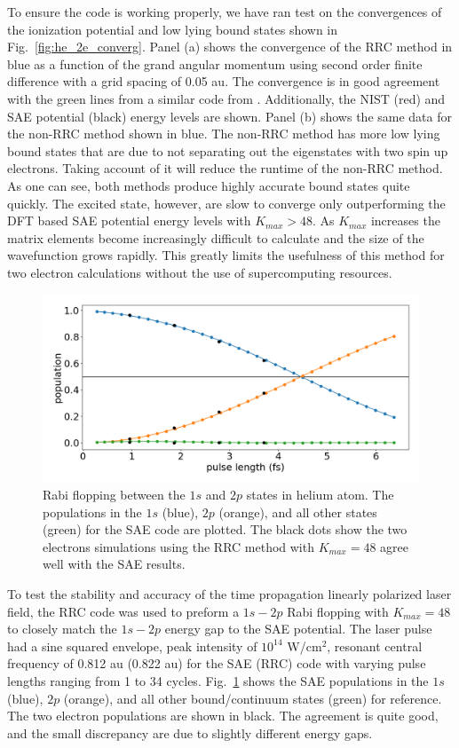 To ensure the code is working properly, we have ran test on the convergences of the ionization potential and low lying bound states shown in Fig.~\ref{fig:he_2e_converg}. Panel (a) shows the convergence of the RRC method in blue as a function of the grand angular momentum using second order finite difference with a grid spacing of 0.05 au. The convergence is in good agreement with the green lines from a similar code from \cite{khan2015}. Additionally, the NIST  (red) and SAE potential (black) energy levels are shown. Panel (b) shows the same data for the non-RRC method shown in blue. The non-RRC method has more low lying bound states that are due to not separating out the eigenstates with two spin up electrons. Taking account of it will reduce the runtime of the non-RRC method. As one can see, both methods produce highly accurate bound states quite quickly. The excited state, however, are slow to converge only outperforming the DFT based SAE potential energy levels with $K_{max} > 48$. As $K_{max}$ increases the matrix elements become increasingly difficult to calculate and the size of the wavefunction grows rapidly. This greatly limits the usefulness of this method for two electron calculations without the use of supercomputing resources.


\begin{figure}[!ht]
\centering
\includegraphics[width=\linewidth]{figs/Two_electron/1s-2p_rabi_flop_ee_sae.png}
\caption{Rabi flopping between the $1s$ and $2p$ states in helium atom. The populations in the $1s$ (blue), $2p$ (orange), and all other states (green) for the SAE code are plotted. The black dots show the two electrons simulations using the RRC method with $K_{max}=48$ agree well with the SAE results.
} 
  \label{fig:he_rabi_flop_ee}
\end{figure}

To test the stability and accuracy of the time propagation linearly polarized laser field, the RRC code was used to preform a $1s-2p$ Rabi flopping with $K_{max} = 48$ to closely match the $1s-2p$ energy gap to the SAE potential. The laser pulse had a sine squared envelope, peak intensity of $10^{14}$ W/cm$^2$, resonant central frequency of 0.812 au (0.822 au) for the SAE (RRC) code with varying pulse lengths ranging from 1 to 34 cycles. Fig.~\ref{fig:he_rabi_flop_ee} shows the SAE populations in the $1s$ (blue), $2p$ (orange), and all other bound/continuum states (green) for reference. The two electron populations are shown in black. The agreement is quite good, and the small discrepancy are due to slightly different energy gaps.

